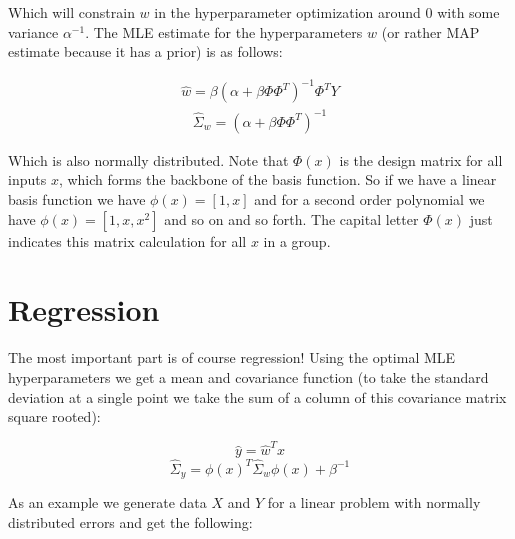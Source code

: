 \documentclass[12pt]{article}
\begin{document}
\vspace{5mm}

Which will constrain $w$ in the hyperparameter optimization around 0 with some variance $\alpha^{-1}$. The MLE estimate for the hyperparameters $w$ (or rather MAP estimate because it has a prior) is as follows:

\begin{align*}
\hat{w}=\beta (\alpha+\beta \Phi \Phi^T)^{-1} \Phi^T Y
\end{align*}
\begin{align*}
\hat{\Sigma}_{w}= (\alpha+\beta \Phi \Phi^T)^{-1}
\end{align*}

\vspace{5mm}

Which is also normally distributed. Note that $\Phi(x)$ is the design matrix for all inputs $x$, which forms the backbone of the basis function. So if we have a linear basis function we have $\phi(x)=[1,x]$ and for a second order polynomial we have $\phi(x)=[1,x,x^2]$ and so on and so forth. The capital letter $\Phi(x)$ just indicates this matrix calculation for all $x$ in a group.

\section{Regression}

The most important part is of course regression! Using the optimal MLE hyperparameters we get a mean and covariance function (to take the standard deviation at a single point we take the sum of a column of this covariance matrix square rooted):

\begin{equation}
\hat{y}=\hat{w}^T x
\end{equation}
\begin{equation}
\hat{\Sigma}_{y}=\phi(x)^T \hat{\Sigma}_{w} \phi(x) + \beta^{-1}
\end{equation}

\vspace{5mm}

As an example we generate data $X$ and $Y$ for a linear problem with normally distributed errors and get the following:
\end{document}
